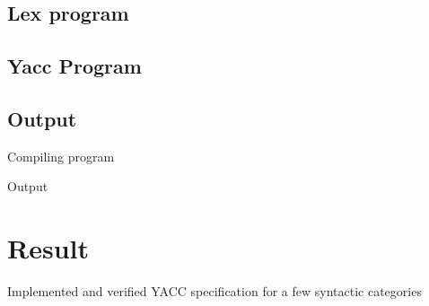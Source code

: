 \subsection{Lex program}

\subsection{Yacc Program}

\subsection{Output}
Compiling program



\vspace{0.5cm}
Output


\section{Result}
Implemented and verified YACC specification for a few syntactic categories